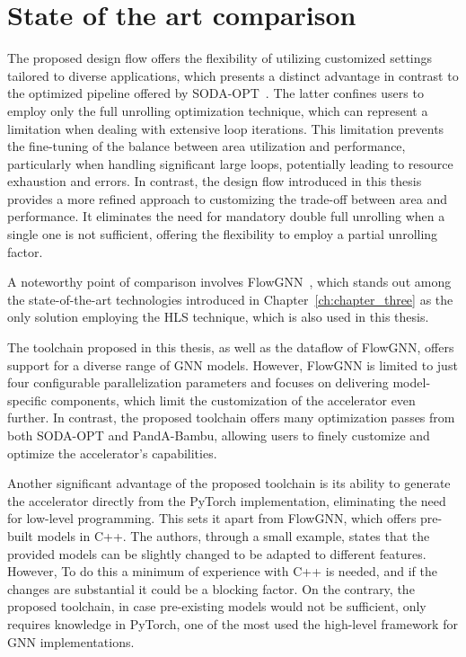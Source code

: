 \section{State of the art comparison}
\label{sec:sota-comparison}%

The proposed design flow offers the flexibility of utilizing customized settings tailored to diverse applications, which presents a distinct advantage in contrast to the optimized pipeline offered by SODA-OPT~\cite{9786533}.
The latter confines users to employ only the full unrolling optimization technique, which can represent a limitation when dealing with extensive loop iterations.
This limitation prevents the fine-tuning of the balance between area utilization and performance, particularly when handling significant large loops, potentially leading to resource exhaustion and errors.
In contrast, the design flow introduced in this thesis provides a more refined approach to customizing the trade-off between area and performance.
It eliminates the need for mandatory double full unrolling when a single one is not sufficient, offering the flexibility to employ a partial unrolling factor.

A noteworthy point of comparison involves FlowGNN~\cite{sarkar2022flowgnn}, which stands out among the state-of-the-art technologies introduced in Chapter~\ref{ch:chapter_three} as the only solution employing the HLS technique, which is also used in this thesis.

The toolchain proposed in this thesis, as well as the dataflow of FlowGNN, offers support for a diverse range of GNN models.
However, FlowGNN is limited to just four configurable parallelization parameters and focuses on delivering model-specific components, which limit the customization of the accelerator even further.
In contrast, the proposed toolchain offers many optimization passes from both SODA-OPT and PandA-Bambu, allowing users to finely customize and optimize the accelerator's capabilities.

Another significant advantage of the proposed toolchain is its ability to generate the accelerator directly from the PyTorch implementation, eliminating the need for low-level programming.
This sets it apart from FlowGNN, which offers pre-built models in C++.
The authors, through a small example, states that the provided models can be slightly changed to be adapted to different features.
However, To do this a minimum of experience with C++ is needed, and if the changes are substantial it could be a blocking factor.
On the contrary, the proposed toolchain, in case pre-existing models would not be sufficient, only requires knowledge in PyTorch, one of the most used the high-level framework for GNN implementations.


